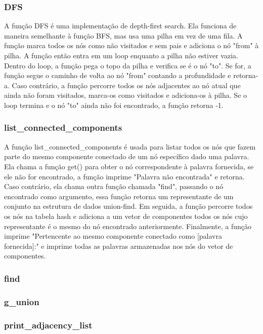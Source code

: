 \documentclass[a4paper,11pt]{article}
\begin{document}
    \subsubsection{DFS}
    A função DFS é uma implementação de depth-first search. Ela funciona de maneira semelhante à função BFS, mas usa uma pilha em vez de uma fila. A função marca todos os nós como não visitados e sem pais e adiciona o nó "from" à pilha. A função então entra em um loop enquanto a pilha não estiver vazia. Dentro do loop, a função pega o topo da pilha e verifica se é o nó "to". Se for, a função segue o caminho de volta ao nó "from" contando a profundidade e retorna-a. Caso contrário, a função percorre todos os nós adjacentes ao nó atual que ainda não foram visitados, marca-os como visitados e adiciona-os à pilha. Se o loop termina e o nó "to" ainda não foi encontrado, a função retorna -1.
    
    \subsubsection{list\_connected\_components}
    A função list\_connected\_components é usada para listar todos os nós que fazem parte do mesmo componente conectado de um nó específico dado uma palavra. Ela chama a função get() para obter o nó correspondente à palavra fornecida, se ele não for encontrado, a função imprime "Palavra não encontrada" e retorna. Caso contrário, ela chama outra função chamada "find", passando o nó encontrado como argumento, essa função retorna um representante de um conjunto na estrutura de dados union-find. Em seguida, a função percorre todos os nós na tabela hash e adiciona a um vetor de componentes todos os nós cujo representante é o mesmo do nó encontrado anteriormente. Finalmente, a função imprime "Pertencente ao mesmo componente conectado como [palavra fornecida]:" e imprime todas as palavras armazenadas nos nós do vetor de componentes.
    
    \subsubsection{find}
    
    \subsubsection{g\_union}
    
    \subsubsection{print\_adjacency\_list}
    
\end{document}
